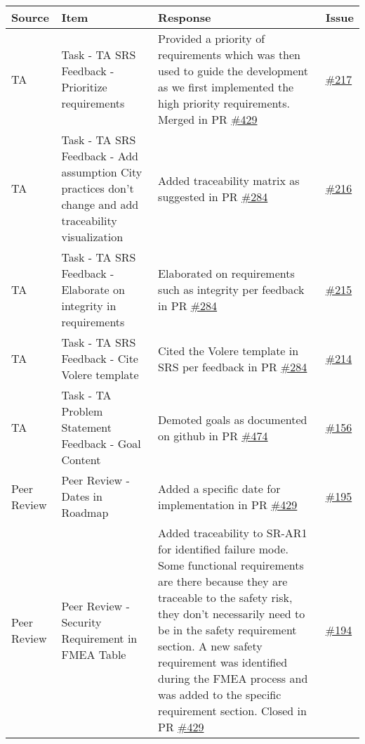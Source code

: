 \documentclass{article}
\begin{document}
\begin{longtable}{|m{3cm}|m{3cm}|m{5cm}|m{1cm}|}
  \hline
  \textbf{Source} & \textbf{Item} & \textbf{Response} & \textbf{Issue}\\
  \hline
  TA & Task - TA SRS Feedback - Prioritize requirements & Provided a priority of requirements which was then used to guide the
  development as we first implemented the high priority requirements. Merged in PR \href{https://github.com/Spitgranger/SyncMaster/pull/429}{\#429} & \href{https://github.com/Spitgranger/SyncMaster/pull/217}{\#217}\\
  \hline
  TA & Task - TA SRS Feedback - Add assumption City practices don't change and add traceability visualization &
  Added traceability matrix as suggested in PR \href{https://github.com/Spitgranger/SyncMaster/pull/284}{\#284} & \href{https://github.com/Spitgranger/SyncMaster/pull/216}{\#216}\\
  \hline
  TA & Task - TA SRS Feedback - Elaborate on integrity in requirements & Elaborated on requirements such as integrity per 
  feedback in PR \href{https://github.com/Spitgranger/SyncMaster/pull/284}{\#284} & \href{https://github.com/Spitgranger/SyncMaster/pull/215}{\#215}\\
  \hline
  TA & Task - TA SRS Feedback - Cite Volere template & Cited the Volere template in SRS per feedback in PR \href{https://github.com/Spitgranger/SyncMaster/pull/284}{\#284} & \href{https://github.com/Spitgranger/SyncMaster/pull/214}{\#214}\\
  \hline
  TA & Task - TA Problem Statement Feedback - Goal Content & Demoted goals as documented on github in PR \href{https://github.com/Spitgranger/SyncMaster/pull/474}{\#474}
   & \href{https://github.com/Spitgranger/SyncMaster/pull/156}{\#156}\\
  \hline
  Peer Review & Peer Review - Dates in Roadmap & Added a specific date for implementation in PR \href{https://github.com/Spitgranger/SyncMaster/pull/429}{\#429} 
  & \href{https://github.com/Spitgranger/SyncMaster/pull/195}{\#195} \\
 \hline
 Peer Review & Peer Review - Security Requirement in FMEA Table & Added traceability to SR-AR1 for identified failure mode.
 Some functional requirements are there because they are traceable to the safety risk, 
 they don't necessarily need to be in the safety requirement section.
  A new safety requirement was identified during the FMEA process and was added to the specific requirement section.
  Closed in PR \href{https://github.com/Spitgranger/SyncMaster/pull/429}{\#429} & \href{https://github.com/Spitgranger/SyncMaster/pull/194}{\#194}\\

\end{longtable}
\end{document}
